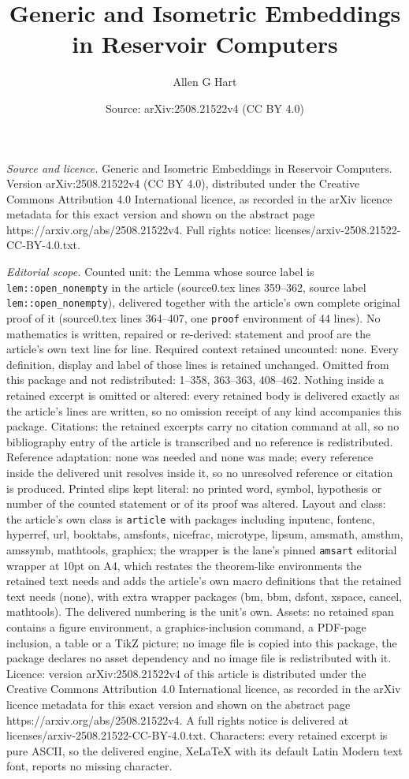 \documentclass[10pt,a4paper]{amsart}
\title[Generic and Isometric Embeddings in Reservoir Computers]{Generic and Isometric Embeddings in Reservoir Computers}
\author{Allen G Hart}
\date{Source: arXiv:2508.21522v4 (CC BY 4.0)}
\begin{document}
\maketitle

\noindent\emph{Source and licence.} Generic and Isometric Embeddings in Reservoir Computers. Version arXiv:2508.21522v4 (CC BY 4.0), distributed under the Creative Commons Attribution 4.0 International licence, as recorded in the arXiv licence metadata for this exact version and shown on the abstract page https://arxiv.org/abs/2508.21522v4. Full rights notice: licenses/arxiv-2508.21522-CC-BY-4.0.txt.\par\smallskip

\noindent\textit{Editorial scope.} Counted unit: the Lemma whose source label is \texttt{lem::open\_nonempty} in the article (source0.tex lines 359--362, source label \texttt{lem::open\_nonempty}), delivered together with the article's own complete original proof of it (source0.tex lines 364--407, one \texttt{proof} environment of 44 lines). No mathematics is written, repaired or re-derived: statement and proof are the article's own text line for line. Required context retained uncounted: none. Every definition, display and label of those lines is retained unchanged. Omitted from this package and not redistributed: 1--358, 363--363, 408--462. Nothing inside a retained excerpt is omitted or altered: every retained body is delivered exactly as the article's lines are written, so no omission receipt of any kind accompanies this package. Citations: the retained excerpts carry no citation command at all, so no bibliography entry of the article is transcribed and no reference is redistributed. Reference adaptation: none was needed and none was made; every reference inside the delivered unit resolves inside it, so no unresolved reference or citation is produced. Printed slips kept literal: no printed word, symbol, hypothesis or number of the counted statement or of its proof was altered. Layout and class: the article's own class is \texttt{article} with packages including inputenc, fontenc, hyperref, url, booktabs, amsfonts, nicefrac, microtype, lipsum, amsmath, amsthm, amssymb, mathtools, graphicx; the wrapper is the lane's pinned \texttt{amsart} editorial wrapper at 10pt on A4, which restates the theorem-like environments the retained text needs and adds the article's own macro definitions that the retained text needs (none), with extra wrapper packages (bm, bbm, dsfont, xspace, cancel, mathtools). The delivered numbering is the unit's own. Assets: no retained span contains a figure environment, a graphics-inclusion command, a PDF-page inclusion, a table or a TikZ picture; no image file is copied into this package, the package declares no asset dependency and no image file is redistributed with it. Licence: version arXiv:2508.21522v4 of this article is distributed under the Creative Commons Attribution 4.0 International licence, as recorded in the arXiv licence metadata for this exact version and shown on the abstract page https://arxiv.org/abs/2508.21522v4. A full rights notice is delivered at licenses/arxiv-2508.21522-CC-BY-4.0.txt. Characters: every retained excerpt is pure ASCII, so the delivered engine, XeLaTeX with its default Latin Modern text font, reports no missing character.
\end{document}
